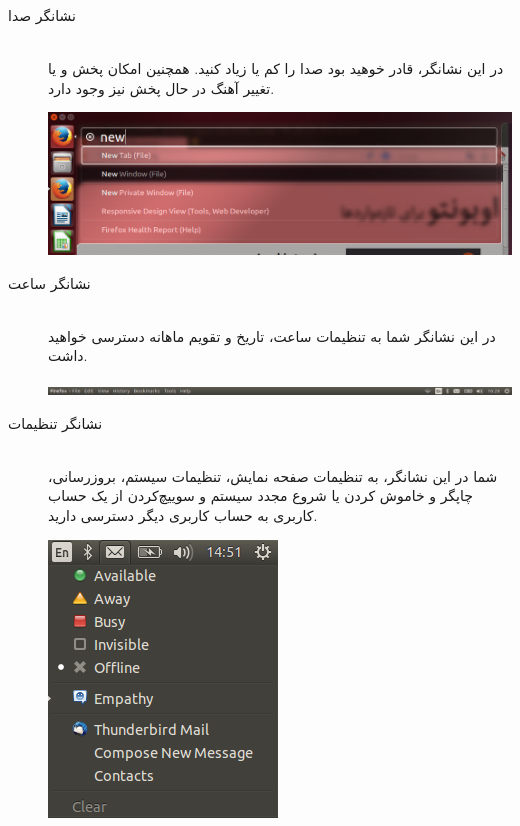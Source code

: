 \begin{description}
\item[نشانگر صدا] \hfill \\
در این نشانگر، قادر خوهید بود صدا را کم یا زیاد کنید. همچنین امکان پخش و یا تغییر آهنگ در حال پخش نیز وجود دارد.
\begin{center}
\includegraphics[scale=0.43]{pics/16.png}
\end{center}

\item[نشانگر ساعت] \hfill \\
در این نشانگر شما به تنظیمات ساعت، تاریخ و تقویم ماهانه دسترسی خواهید داشت.
\begin{center}
\includegraphics[scale=0.43]{pics/17.png}
\end{center}

\item[نشانگر تنظیمات] \hfill \\
شما در این نشانگر، به تنظیمات صفحه نمایش، تنظیمات سیستم، بروزرسانی، چاپگر و خاموش کردن یا شروع مجدد سیستم و سوییچ‌کردن از یک حساب کاربری به حساب کاربری دیگر دسترسی دارید.
\begin{center}
\includegraphics[scale=0.43]{pics/18.png}
\end{center}

\end{description}

